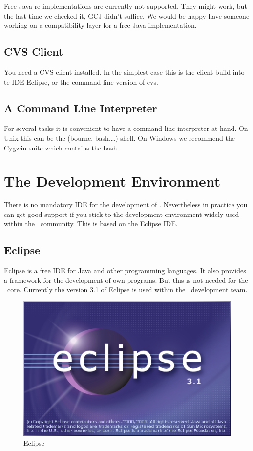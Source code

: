 \documentclass{extex-doc}
\begin{document}
Free Java re-implementations are currently not supported. They might
work, but the last time we checked it, GCJ didn't suffice. We would be
happy have someone working on a compatibility layer for a free Java
implementation.


\section{CVS Client}

You need a CVS client installed. In the simplest case this is the
client build into te IDE Eclipse, or the command line version of cvs.


\section{A Command Line Interpreter}

For several tasks it is convenient to have a command line interpreter
at hand. On Unix this can be the (bourne, bash,\ldots) shell. On Windows
we recommend the Cygwin suite which contains the bash.




\chapter{The Development Environment}

There is no mandatory IDE for the development of \ExTeX. Nevertheless
in practice you can get good support if you stick to the development
environment widely used within the \ExTeX\ community. This is based on
the Eclipse IDE.

\section{Eclipse}

Eclipse is a free IDE for Java and other programming languages. It
also provides a framework for the development of own programs. But
this is not needed for the \ExTeX\ core. Currently the version 3.1 of
Eclipse is used within the \ExTeX\ development team.
\begin{figure}[h]
  \centering  \includegraphics[scale=.5]{image/eclipse-splash}
  \caption{Eclipse}\label{fig:eclipse}
\end{figure}
\end{document}
